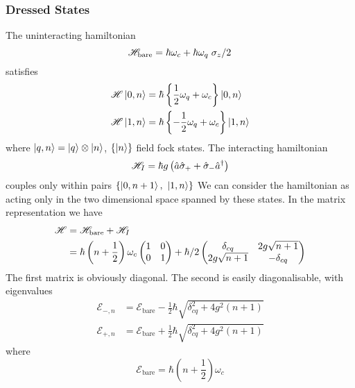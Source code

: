 \subsubsection{Dressed States}
The uninteracting hamiltonian 
\begin{equation}
  \mathscr{H}_{\text{bare}} = \hbar \omega_c + \hbar \omega_q \flatfrac{\sigma_z}{2}
\end{equation}
satisfies 
\begin{align}
  \mathscr{H} \ket{0, n} &= \hbar \left\{\frac{1}{2} \omega_q + \omega_c \right\} \ket{0, n}\\
  \mathscr{H} \ket{1, n} &= \hbar \left\{-\frac{1}{2} \omega_q + \omega_c \right\} \ket{1, n}
\end{align}
where $\ket{q, n} = \ket{q} \otimes\ket{n}$, $\{\ket{n}\}$ field fock states. 
The interacting hamiltonian
\begin{align}
  \mathscr{H}_I = \hbar g \left(\hat{a} \hat{\sigma}_+ + \hat{\sigma}_- {\hat{a}^\dagger}\right)
\end{align}
couples only within pairs $\{\ket{0, n+1},\ \ket{1, n}\}$
We can consider the hamiltonian as acting only in the two dimensional space spanned by these states. 
In the matrix representation we have \cite{Meystre2007}
\begin{align*}
  \mathscr{H} &= \mathscr{H}_{\text{bare}} + \mathscr{H}_I \\
              &= \hbar \left(n+\frac{1}{2}\right) \omega_c 
  \begin{pmatrix}
    \mqty{1 & 0 \\ 0 & 1}
  \end{pmatrix}
              + \hbar / 2
  \begin{pmatrix}
    \mqty{\delta_{cq} & 2g\sqrt{n+1} \\ 2g\sqrt{n+1} & -\delta_{cq}}
  \end{pmatrix}
\end{align*}
The first matrix is obviously diagonal. 
The second is easily diagonalisable, with eigenvalues
\begin{align}
  \mathcal{E}_{-, n} &= \mathcal{E}_{\text{bare}} - \frac{1}{2} \hbar \sqrt{\delta_{cq}^2 + 4g^2 \left(n+1\right)}\\
  \mathcal{E}_{+, n} &= \mathcal{E}_{\text{bare}} + \frac{1}{2} \hbar \sqrt{\delta_{cq}^2 + 4g^2 \left(n+1 \right)}
\end{align}
where
\begin{equation}
  \mathcal{E}_{\text{bare}} = \hbar\left(n + \frac{1}{2}\right) \omega_c
\end{equation}
